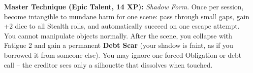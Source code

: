 \begin{tcolorbox}[colback=black!5,colframe=black!70!white,title=\textbf{Shadow Monk (Ikasha)},breakable]
  \vspace{2mm}
  \noindent\textbf{Master Technique (Epic Talent, 14 XP):}
  \textit{Shadow Form.} Once per session, become intangible to mundane harm for one scene: pass through small gaps, gain +2 dice to all Stealth rolls, and automatically succeed on one escape attempt. You cannot manipulate objects normally. After the scene, you collapse with Fatigue 2 and gain a permanent \textbf{Debt Scar} (your shadow is faint, as if you borrowed it from someone else). You may ignore one forced Obligation or debt call -- the creditor sees only a silhouette that dissolves when touched.
\end{tcolorbox}